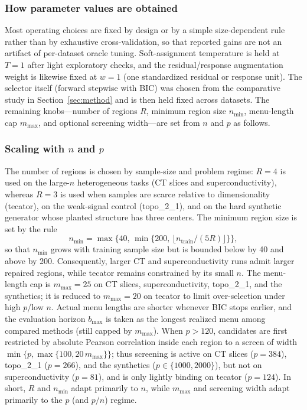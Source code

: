 \documentclass[pdflatex,sn-basic,Numbered]{sn-jnl}
\begin{document}
\subsubsection{How parameter values are obtained}
Most operating choices are fixed by design or by a simple size-dependent rule rather than by exhaustive cross-validation, so that reported gains are not an artifact of per-dataset oracle tuning. Soft-assignment temperature is held at \(T=1\) after light exploratory checks, and the residual/response augmentation weight is likewise fixed at \(w=1\) (one standardized residual or response unit). The selector itself (forward stepwise with BIC) was chosen from the comparative study in Section~\ref{sec:method} and is then held fixed across datasets. The remaining knobs---number of regions \(R\), minimum region size \(n_{\min}\), menu-length cap \(m_{\max}\), and optional screening width---are set from \(n\) and \(p\) as follows.

\subsubsection{Scaling with \texorpdfstring{\(n\)}{n} and \texorpdfstring{\(p\)}{p}}
The number of regions is chosen by sample-size and problem regime: \(R=4\) is used on the large-\(n\) heterogeneous tasks (CT slices and superconductivity), whereas \(R=3\) is used when samples are scarce relative to dimensionality (tecator), on the weak-signal control (topo\_2\_1), and on the hard synthetic generator whose planted structure has three centers. The minimum region size is set by the rule
\[
n_{\min}=\max\bigl\{40,\,\min\{200,\,\lfloor n_{\mathrm{train}}/(5R)\rfloor\}\bigr\},
\]
so that \(n_{\min}\) grows with training sample size but is bounded below by 40 and above by 200. Consequently, larger CT and superconductivity runs admit larger repaired regions, while tecator remains constrained by its small \(n\). The menu-length cap is \(m_{\max}=25\) on CT slices, superconductivity, topo\_2\_1, and the synthetics; it is reduced to \(m_{\max}=20\) on tecator to limit over-selection under high \(p\)/low \(n\). Actual menu lengths are shorter whenever BIC stops earlier, and the evaluation horizon \(b_{\max}\) is taken as the longest realized menu among compared methods (still capped by \(m_{\max}\)). When \(p>120\), candidates are first restricted by absolute Pearson correlation inside each region to a screen of width \(\min\{p,\max\{100,20\,m_{\max}\}\}\); thus screening is active on CT slices (\(p=384\)), topo\_2\_1 (\(p=266\)), and the synthetics (\(p\in\{1000,2000\}\)), but not on superconductivity (\(p=81\)), and is only lightly binding on tecator (\(p=124\)). In short, \(R\) and \(n_{\min}\) adapt primarily to \(n\), while \(m_{\max}\) and screening width adapt primarily to the \(p\) (and \(p/n\)) regime.
\end{document}

